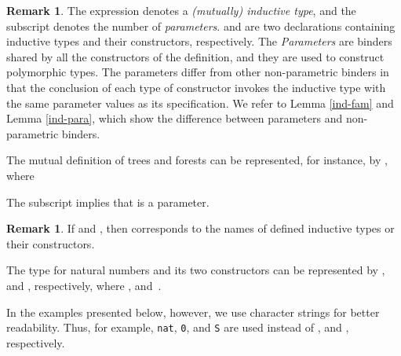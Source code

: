 \documentclass{LMCS}
\theoremstyle{plain}
\theoremstyle{definition}
\newtheorem{remm}[thm]{Remark}
\def\ttt#1{\textup{\texttt{#1}}}
\begin{document}
\begin{remm}\label{rem-treeforest}
  The expression  denotes a \emph{(mutually) inductive type}, and the subscript  denotes the number of \emph{parameters}.  and  are two declarations containing inductive types and their constructors, respectively. The \emph{Parameters} are binders shared by all the constructors of the definition, and they are used to construct polymorphic types.
The parameters differ from other non-parametric binders in that the conclusion of each type of constructor invokes the inductive type with the same parameter values as its specification.
We refer to Lemma \ref{ind-fam} and Lemma \ref{ind-para}, which show the difference between parameters and non-parametric binders.\medskip

The mutual definition of trees and forests can be represented, for instance, by , where

The subscript  implies that  is a parameter.
\medskip
\end{remm}

\begin{remm}\label{rem-nat}
If  and , then  corresponds to the names of defined inductive types or their constructors.\medskip

The type for natural numbers and its two constructors can be represented by 
, and ,
respectively, where , and \,. \medskip

In the examples presented below, however, we use character strings for better readability. Thus, for example, \ttt{nat}, \ttt{0}, and \ttt{S} are used instead of , and , respectively.
\end{remm}
\end{document}
